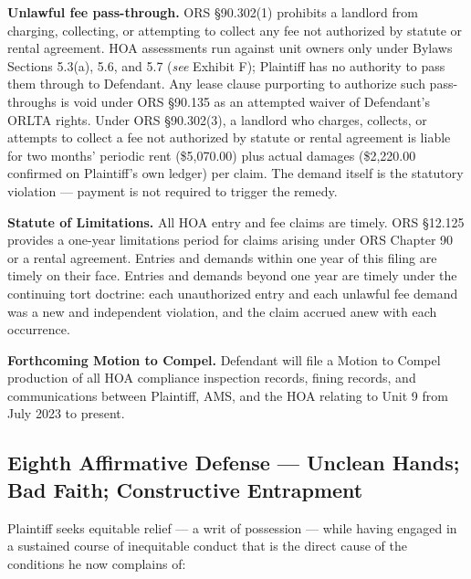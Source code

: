 \documentclass[12pt,letterpaper]{article}
\begin{document}
\textbf{Unlawful fee pass-through.} ORS \S90.302(1) prohibits a landlord from charging, collecting, or attempting to collect any fee not authorized by statute or rental agreement. HOA assessments run against unit owners only under Bylaws Sections 5.3(a), 5.6, and 5.7 (\textit{see} Exhibit F); Plaintiff has no authority to pass them through to Defendant. Any lease clause purporting to authorize such pass-throughs is void under ORS \S90.135 as an attempted waiver of Defendant's ORLTA rights. Under ORS \S90.302(3), a landlord who charges, collects, or attempts to collect a fee not authorized by statute or rental agreement is liable for two months' periodic rent (\$5,070.00) plus actual damages (\$2,220.00 confirmed on Plaintiff's own ledger) per claim. The demand itself is the statutory violation --- payment is not required to trigger the remedy.

\textbf{Statute of Limitations.} All HOA entry and fee claims are timely. ORS \S12.125 provides a one-year limitations period for claims arising under ORS Chapter 90 or a rental agreement. Entries and demands within one year of this filing are timely on their face. Entries and demands beyond one year are timely under the continuing tort doctrine: each unauthorized entry and each unlawful fee demand was a new and independent violation, and the claim accrued anew with each occurrence.

\textbf{Forthcoming Motion to Compel.} Defendant will file a Motion to Compel production of all HOA compliance inspection records, fining records, and communications between Plaintiff, AMS, and the HOA relating to Unit 9 from July 2023 to present.

\subsection{Eighth Affirmative Defense --- Unclean Hands; Bad Faith; Constructive Entrapment}

Plaintiff seeks equitable relief --- a writ of possession --- while having engaged in a sustained course of inequitable conduct that is the direct cause of the conditions he now complains of:
\end{document}
